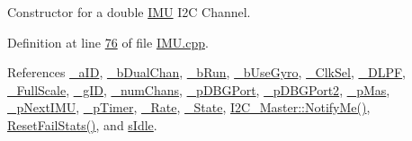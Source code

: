 Constructor for a double \hyperlink{class_i_m_u}{IMU} I2C Channel. 



Definition at line \hyperlink{_i_m_u_8cpp_source_l00076}{76} of file \hyperlink{_i_m_u_8cpp_source}{IMU.cpp}.



References \hyperlink{_i_m_u_8h_source_l00094}{\_\-aID}, \hyperlink{_i_m_u_8h_source_l00090}{\_\-bDualChan}, \hyperlink{_i_m_u_8h_source_l00107}{\_\-bRun}, \hyperlink{_i_m_u_8h_source_l00100}{\_\-bUseGyro}, \hyperlink{_i_m_u_8h_source_l00097}{\_\-ClkSel}, \hyperlink{_i_m_u_8h_source_l00095}{\_\-DLPF}, \hyperlink{_i_m_u_8h_source_l00096}{\_\-FullScale}, \hyperlink{_i_m_u_8h_source_l00093}{\_\-gID}, \hyperlink{_i_m_u_8h_source_l00091}{\_\-numChans}, \hyperlink{_i_m_u_8h_source_l00112}{\_\-pDBGPort}, \hyperlink{_i_m_u_8h_source_l00113}{\_\-pDBGPort2}, \hyperlink{_i_m_u_8h_source_l00089}{\_\-pMas}, \hyperlink{_i_m_u_8h_source_l00114}{\_\-pNextIMU}, \hyperlink{_i_m_u_8h_source_l00106}{\_\-pTimer}, \hyperlink{_i_m_u_8h_source_l00098}{\_\-Rate}, \hyperlink{_i_m_u_8h_source_l00085}{\_\-State}, \hyperlink{class_i2_c___master_a608731d8ae2cf3c9141dd4579f74d5f7}{I2C\_\-Master::NotifyMe()}, \hyperlink{_i_m_u_8h_source_l00200}{ResetFailStats()}, and \hyperlink{_i_m_u_8h_source_l00043}{sIdle}.


